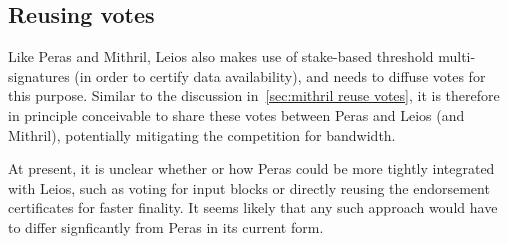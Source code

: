 \subsection{Reusing votes}
Like Peras and Mithril, Leios also makes use of stake-based threshold multi-signatures (in order to certify data availability), and needs to diffuse votes for this purpose.
Similar to the discussion in~\cref{sec:mithril reuse votes}, it is therefore in principle conceivable to share these votes between Peras and Leios (and Mithril), potentially mitigating the competition for bandwidth.

\medskip
At present, it is unclear whether or how Peras could be more tightly integrated with Leios, such as voting for input blocks or directly reusing the endorsement certificates for faster finality.
It seems likely that any such approach would have to differ signficantly from Peras in its current form.


